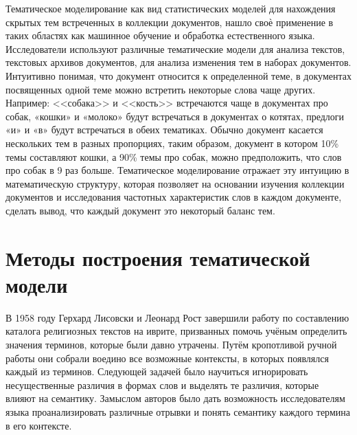 Тематическое моделирование как вид статистических моделей для нахождения скрытых тем встреченных в коллекции документов, нашло своѐ применение в таких областях как машинное обучение и обработка естественного языка. Исследователи используют различные тематические модели для анализа текстов, текстовых архивов документов, для анализа изменения тем в наборах документов. Интуитивно понимая, что документ относится к определенной теме, в документах посвященных одной теме можно встретить некоторые слова чаще других. Например: <<собака>> и <<кость>> встречаются чаще в документах про собак, «кошки» и «молоко» будут встречаться в документах о котятах, предлоги «и» и «в» будут встречаться в обеих тематиках. Обычно документ касается нескольких тем в разных пропорциях, таким образом, документ в котором 10\% темы составляют кошки, а 90\% темы про собак, можно предположить, что слов про собак в 9 раз больше. Тематическое моделирование отражает эту интуицию в математическую структуру, которая позволяет на основании изучения коллекции документов и исследования частотных характеристик слов в каждом документе, сделать вывод, что каждый документ это некоторый баланс тем.

\section{Методы построения тематической модели}
\label{sec:tm_techniques}

В 1958 году Герхард Лисовски и Леонард Рост завершили работу по составлению каталога религиозных текстов на иврите, призванных помочь учёным определить значения терминов, которые были давно утрачены. Путём кропотливой ручной работы они собрали воедино все возможные контексты, в которых появлялся каждый из терминов. Следующей задачей было научиться игнорировать несущественные различия в формах слов и выделять те различия, которые влияют на семантику. Замыслом авторов было дать возможность исследователям языка проанализировать различные отрывки и понять семантику каждого термина в его контексте. 

